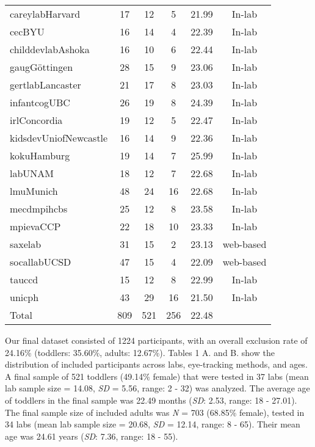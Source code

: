 \documentclass[
  man,floatsintext]{apa6}
\begin{document}
\begin{center}
\begin{ThreePartTable}
{\begin{longtable}{lccccc}
careylabHarvard & 17 & 12 & 5 & 21.99 & In-lab\\
cecBYU & 16 & 14 & 4 & 22.39 & In-lab\\
childdevlabAshoka & 16 & 10 & 6 & 22.44 & In-lab\\
gaugGöttingen & 28 & 15 & 9 & 23.06 & In-lab\\
gertlabLancaster & 21 & 17 & 8 & 23.03 & In-lab\\
infantcogUBC & 26 & 19 & 8 & 24.39 & In-lab\\
irlConcordia & 19 & 12 & 5 & 22.47 & In-lab\\
kidsdevUniofNewcastle & 16 & 14 & 9 & 22.36 & In-lab\\
kokuHamburg & 19 & 14 & 7 & 25.99 & In-lab\\
labUNAM & 18 & 12 & 7 & 22.68 & In-lab\\
lmuMunich & 48 & 24 & 16 & 22.68 & In-lab\\
mecdmpihcbs & 25 & 12 & 8 & 23.58 & In-lab\\
mpievaCCP & 22 & 18 & 10 & 23.33 & In-lab\\
saxelab & 31 & 15 & 2 & 23.13 & web-based\\
socallabUCSD & 47 & 15 & 4 & 22.09 & web-based\\
tauccd & 15 & 12 & 8 & 22.99 & In-lab\\
unicph & 43 & 29 & 16 & 21.50 & In-lab\\
Total & 809 & 521 & 256 & 22.48 & \\
\bottomrule
\end{longtable}

}

\end{ThreePartTable}
\end{center}

Our final dataset consisted of 1224 participants, with an overall exclusion rate of 24.16\% (toddlers: 35.60\%, adults: 12.67\%).
Tables 1 A. and B. show the distribution of included participants across labs, eye-tracking methods, and ages.
A final sample of 521 toddlers (49.14\% female) that were tested in 37 labs (mean lab sample size = 14.08, \emph{SD} = 5.56, range: 2 - 32) was analyzed.
The average age of toddlers in the final sample was 22.49 months (\emph{SD}: 2.53, range: 18 - 27.01).
The final sample size of included adults was \emph{N} = 703 (68.85\% female), tested in 34 labs (mean lab sample size = 20.68, \emph{SD} = 12.14, range: 8 - 65).
Their mean age was 24.61 years (\emph{SD}: 7.36, range: 18 - 55).
\end{document}
